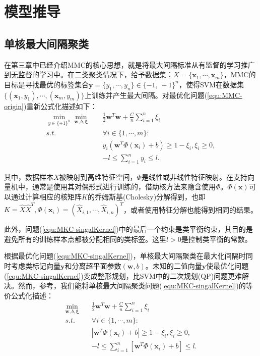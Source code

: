\section{模型推导}
\subsection{单核最大间隔聚类}
在第三章中已经介绍MMC的核心思想，就是将最大间隔标准从有监督的学习推广到无监督的学习中。在二类聚类情况下，给予数据集：$X=\{\mathbf{x}_1,\cdots,\mathbf{x}_m\}$，MMC的目标是寻找最优的标签集合$\mathbf{y}=\{y_1,\cdots,y_n\}\in\{-1,\,+1\}^n$，使得SVM在数据集$\{(\mathbf{x}_1,y_1),\cdots,(\mathbf{x}_m,y_m)\}$上训练并产生最大间隔。对最优化问题(\ref{equ:MMC-origin})重新公式化描述如下：
\begin{equation}
\begin{split}
\min_{y\in\{\pm1\}^n}\min_{\mathbf{w},b,\mathbf{\xi}} \quad & \frac{1}{2}\mathbf{w}^T\mathbf{w}+\frac{C}{n}\sum^n_{i=1}\xi_i \\
s.t. \quad & \forall i\in\{1,\cdots,m\}: \\
& y_i(\mathbf{w}^T\Phi(\mathbf{x}_i)+b) \ge 1-\xi_i,\xi_i \ge 0,  \\
& -l \le \sum^n_{i=1}y_i \le l.
\label{equ:MKC-singalKernel}
\end{split}
\end{equation}

其中，数据样本$X$被映射到高维特征空间，$\Phi$是线性或非线性特征映射。在支持向量机中，通常是使用其对偶形式进行训练的，借助核方法来隐含使用$\Phi$。$\Phi(\mathbf{x})$可以通过计算相应的核矩阵$K$的乔姆斯基(Cholesky)分解得到，也即$K=\hat{X}\hat{X}^T,\Phi(\mathbf{x}_i)=(\hat{X}_{i,1},\cdots,\hat{X}_{i,n})^T$，或者使用特征分解也能得到相同的结果。

此外，问题(\ref{equ:MKC-singalKernel})中的最后一个约束是类平衡约束，其目的是避免所有的训练样本点都被分配相同的类标签。这里$l > 0$是控制类平衡的常数。

根据最优化问题(\ref{equ:MKC-singalKernel})，单核最大间隔聚类在最大化间隔时同时考虑类标记向量$\mathbf{y}$和分离超平面参数$(\mathbf{w},b)$。未知的二值向量$\mathbf{y}$使最优化问题(\ref{equ:MKC-singalKernel})变成整形规划，比SVM中的二次规划(QP)问题更难解决。然而，参考，我们能将单核最大间隔聚类问题(\ref{equ:MKC-singalKernel})的等价公式化描述：
\begin{equation}
\begin{split}
\min_{\mathbf{w},b,\mathbf{\xi}}  \quad  & \frac{1}{2}\mathbf{w}^T\mathbf{w}+\frac{C}{n}\sum^n_{i=1}\xi_i \\
s.t. \quad & \forall i\in\{1,\cdots,m\}:  \\
& \left |\mathbf{w}^T\Phi(\mathbf{x}_i)+b \right | \ge 1-\xi_i,\xi_i \ge 0,  \\
& -l \le \sum^n_{i=1} \left [\mathbf{w}^T\Phi(\mathbf{x}_i)+b \right ] \le l.  
\label{equ:MKC-singalKernelRelax}
\end{split}
\end{equation}

